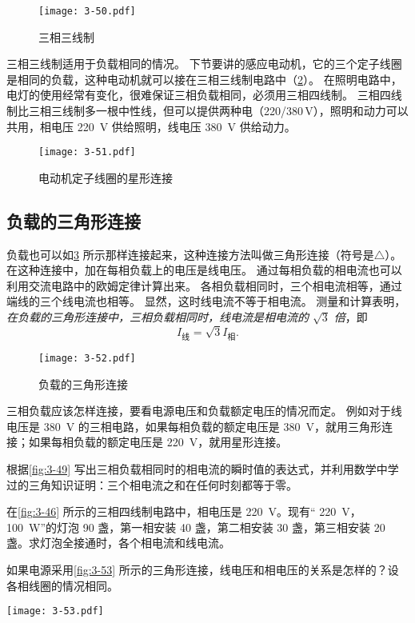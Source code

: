 \begin{figure}
  \texttt{[image: 3-50.pdf]}
  \caption{三相三线制}\label{fig:3-50}
\end{figure}

三相三线制适用于负载相同的情况。
下节要讲的感应电动机，它的三个定子线圈是相同的负载，这种电动机就可以接在三相三线制电路中（\cref{fig:3-51}）。
在照明电路中，电灯的使用经常有变化，很难保证三相负载相同，必须用三相四线制。
三相四线制比三相三线制多一根中性线，但可以提供两种电（220/380\,\unit{V}），照明和动力可以共用，相电压  \qty{220}{V} 供给照明，线电压 \qty{380}{V} 供给动力。
\begin{figure}
  \texttt{[image: 3-51.pdf]}
  \caption{电动机定子线圈的星形连接}\label{fig:3-51}
\end{figure}

\subsection{负载的三角形连接}

负载也可以如\cref{fig:3-52} 所示那样连接起来，这种连接方法叫做三角形连接（符号是$\triangle$）。
在这种连接中，加在每相负载上的电压是线电压。
通过每相负载的相电流也可以利用交流电路中的欧姆定律计算出来。
各相负载相同时，三个相电流相等，通过端线的三个线电流也相等。
显然，这时线电流不等于相电流。
测量和计算表明，\emph{在负载的三角形连接中，三相负载相同时，线电流是相电流的 $\sqrt{3}$ 倍}，即
\[I_{\text{线}}=\sqrt{3}I_{\text{相}}.\]
\begin{figure}
  \texttt{[image: 3-52.pdf]}
  \caption{负载的三角形连接}\label{fig:3-52}
\end{figure}

三相负载应该怎样连接，要看电源电压和负载额定电压的情况而定。
例如对于线电压是 \qty{380}{V} 的三相电路，如果每相负载的额定电压是 \qty{380}{V}，就用三角形连接；如果每相负载的额定电压是 \qty{220}{V}，就用星形连接。

\begin{Practice}
\begin{question}
  \item 根据\cref{fig:3-49} 写出三相负载相同时的相电流的瞬时值的表达式，并利用数学中学过的三角知识证明：三个相电流之和在任何时刻都等于零。
  \item 在\cref{fig:3-46} 所示的三相四线制电路中，相电压是 \qty{220}{V}。现有“ \qty{220}{V}，\qty{100}{W}”的灯泡 90 盏，第一相安装 40 盏，第二相安装 30 盏，第三相安装 20 盏。求灯泡全接通时，各个相电流和线电流。
  \item 如果电源采用\cref{fig:3-53} 所示的三角形连接，线电压和相电压的关系是怎样的？设各相线圈的情况相同。
  \begin{figurehere}
    \begin{minipage}{\linewidth}\centering
      \texttt{[image: 3-53.pdf]}
      \caption{}\label{fig:3-53}
    \end{minipage}
    \end{figurehere}
\end{question}
\end{Practice}

